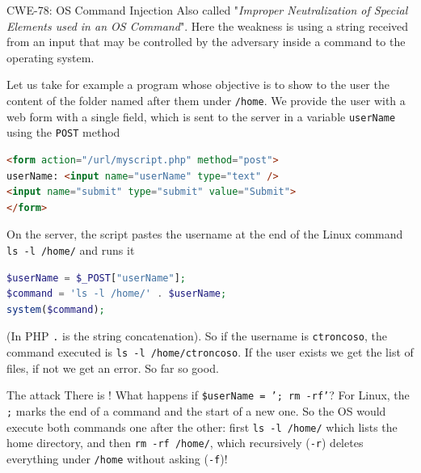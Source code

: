 \begin{parag}{CWE-78: OS Command Injection}
    Also called "\textit{Improper Neutralization of Special Elements used in an OS Command}". Here the weakness is using a string received from an input that may be controlled by the adversary inside a command to the operating system.

    Let us take for example a program whose objective is to show to the user the content of the folder named after them under \texttt{/home}. We provide the user with a web form with a single field, which is sent to the server in a variable \texttt{userName} using the \texttt{POST} method
    \begin{lstlisting}[language=HTML]
<form action="/url/myscript.php" method="post">
userName: <input name="userName" type="text" />
<input name="submit" type="submit" value="Submit">
</form>
    \end{lstlisting}
    On the server, the script pastes the username at the end of the Linux command \texttt{ls -l /home/} and runs it
    \begin{lstlisting}[language=PHP]
$userName = $_POST["userName"];
$command = 'ls -l /home/' . $userName;
system($command);
    \end{lstlisting}
    (In PHP \texttt{.} is the string concatenation). So if the username is \texttt{ctroncoso}, the command executed is \texttt{ls -l /home/ctroncoso}. If the user exists we get the list of files, if not we get an error. So far so good.
    \begin{subparag}{The attack}
        There is ! What happens if \texttt{\$userName = '; rm -rf'}? For Linux, the \texttt{;} marks the end of a command and the start of a new one. So the OS would execute both commands one after the other: first \texttt{ls -l /home/} which lists the home directory, and then \texttt{rm -rf /home/}, which recursively (\texttt{-r}) deletes everything under \texttt{/home} without asking (\texttt{-f})!
    \end{subparag}
\end{parag}

